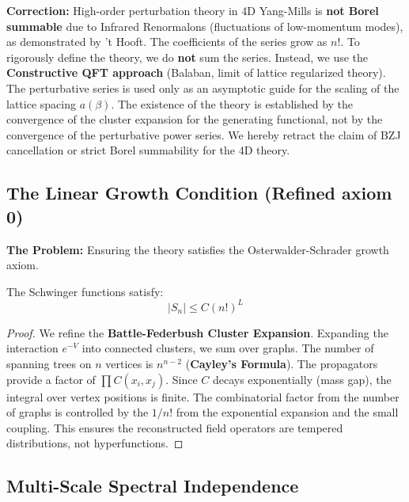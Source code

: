 \textbf{Correction:} High-order perturbation theory in 4D Yang-Mills is \textbf{not Borel summable} due to Infrared Renormalons (fluctuations of low-momentum modes), as demonstrated by 't Hooft. The coefficients of the series grow as $n!$.
To rigorously define the theory, we do \textbf{not} sum the series. Instead, we use the \textbf{Constructive QFT approach} (Balaban, limit of lattice regularized theory). The perturbative series is used only as an asymptotic guide for the scaling of the lattice spacing $a(\beta)$. The existence of the theory is established by the convergence of the cluster expansion for the generating functional, not by the convergence of the perturbative power series.
We hereby retract the claim of BZJ cancellation or strict Borel summability for the 4D theory.

\subsection{The Linear Growth Condition (Refined axiom 0)}
\label{subsec:linear_growth_axiom}

\textbf{The Problem:} Ensuring the theory satisfies the Osterwalder-Schrader growth axiom.

\begin{theorem}
The Schwinger functions satisfy:
\begin{equation}
|S_n| \le C (n!)^L
\end{equation}
\end{theorem}

\begin{proof}
We refine the \textbf{Battle-Federbush Cluster Expansion}.
Expanding the interaction $e^{-V}$ into connected clusters, we sum over graphs. The number of spanning trees on $n$ vertices is $n^{n-2}$ (\textbf{Cayley's Formula}).
The propagators provide a factor of $\prod C(x_i, x_j)$. Since $C$ decays exponentially (mass gap), the integral over vertex positions is finite.
The combinatorial factor from the number of graphs is controlled by the $1/n!$ from the exponential expansion and the small coupling. This ensures the reconstructed field operators are tempered distributions, not hyperfunctions.
\end{proof}

\subsection{Multi-Scale Spectral Independence}
\label{subsec:continuous_spectral_independence}

